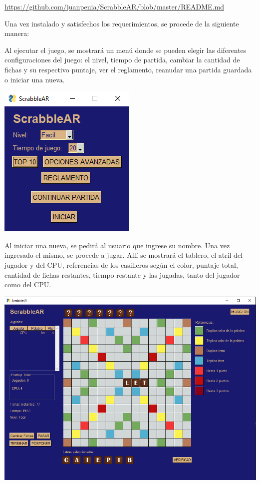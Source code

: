 \documentclass[12pt]{article}
\begin{document}
\href{https://github.com/juanpenia/ScrabbleAR/blob/master/README.md}{https://github.com/juanpenia/ScrabbleAR/blob/master/README.md}
\newline

Una vez instalado y satisfechos los requerimientos, se procede de la siguiente manera:

Al ejecutar el juego, se mostrará un menú donde se pueden elegir las diferentes configuraciones del juego: el nivel, tiempo de partida, cambiar la cantidad de fichas y su respectivo puntaje, ver el reglamento, reanudar una partida guardada o iniciar una nueva.

\begin{center}
    \includegraphics{images/p1.png}
\end{center}

Al iniciar una nueva, se pedirá al usuario que ingrese su nombre. Una vez ingresado el mismo, se procede a jugar. Allí se mostrará el tablero, el atril del jugador y del CPU, referencias de los casilleros según el color, puntaje total, cantidad de fichas restantes, tiempo restante y las jugadas, tanto del jugador como del CPU.

\includegraphics[width=\textwidth]{images/p2.png}
\end{document}
